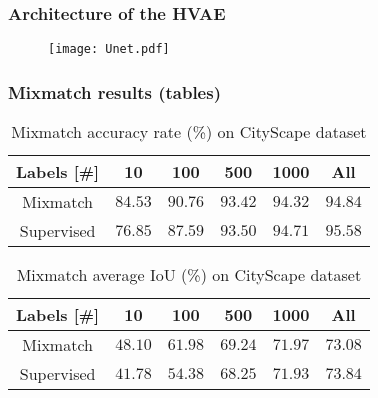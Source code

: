 \documentclass[11pt]{beamer}
\begin{document}
\begin{frame}
    \frametitle{Architecture of the HVAE}
    \begin{figure}[t]
        \centering
        \texttt{[image: Unet.pdf]}
    \end{figure}
\end{frame}

\begin{frame}
    \frametitle{Mixmatch results (tables)}
    \begin{table}[tbh]
        \begin{tabular}{|c|c|c|c|c|c|}
        \hline
        Labels [\#]  & 10 & 100 & 500 & 1000 & All \\
        \hline
        Mixmatch & $84.53$ & $90.76$ & $93.42$ & $94.32$ & $94.84$ \\
        \hline
        Supervised & $76.85$ & $87.59$ & $93.50$ & $94.71$ & $95.58$ \\
        \hline
        \end{tabular}
        \caption{Mixmatch accuracy rate (\%) on CityScape dataset}
    \end{table}
    \begin{table}[tbh]
        \begin{tabular}{|c|c|c|c|c|c|}
        \hline
        Labels [\#]  & 10 & 100 & 500 & 1000 & All \\
        \hline
        Mixmatch & $48.10$ & $61.98$ & $69.24$ & $71.97$ & $73.08$ \\
        \hline
        Supervised & $41.78$ & $54.38$ & $68.25$ & $71.93$ & $73.84$ \\
        \hline
        \end{tabular}
        \caption{Mixmatch average IoU (\%) on CityScape dataset}
    \end{table}
\end{frame}
\end{document}
